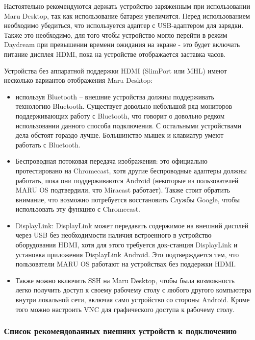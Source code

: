 \documentclass[a4paper, 14pt]{article}
\begin{document}
\par Настоятельно рекомендуются держать устройство заряженным при использовании Maru Desktop, так как использование батареи увеличится. Перед использованием необходимо убедиться, что используется адаптер с USB-адаптером для зарядки. Также это необходимо, для того чтобы устройство могло перейти в режим Daydream при превышении времени ожидания на экране - это будет включать питание дисплея HDMI, пока на устройстве отображается заставка часов.

\par Устройства без аппаратной поддержки HDMI (SlimPort или MHL) имеют несколько вариантов отображения Maru Desktop:
\begin{itemize}
    \item используя Bluetooth -- внешние устройства должны поддерживать технологию Bluetooth. Существует довольно небольшой ряд мониторов поддерживающих работу с Bluetooth, что говорит о довольно редком использовании данного способа подключения. С остальными устройствами дела обстоят гораздо лучше. Большинство мышек и клавиатур умеют работать с Bluetooth.
    \item Беспроводная потоковая передача изображения: это официально протестировано на Chromecast, хотя другие беспроводные адаптеры должны работать, пока они поддерживаются Android (некоторые из пользователей MARU OS подтвердили, что Miracast работает). Также стоит обратить внимание, что возможно потребуется восстановить Службы Google, чтобы использовать эту функцию с Chromecast.
    \item DisplayLink: DisplayLink может передавать содержимое на внешний дисплей через USB без необходимости наличия встроенного в устройство оборудования HDMI, хотя для этого требуется док-станция DisplayLink и установка приложения DisplayLink Android. Это подтверждается тем, что пользователи MARU OS работают на устройствах без поддержки HDMI.
    \item Также можно включить SSH на Maru Desktop, чтобы была возможность легко получить доступ к своему рабочему столу с любого другого компьютера внутри локальной сети, включая само устройство со стороны Android. Кроме того можно настроить VNC для графического доступа к рабочему столу.
\end{itemize}


\subsubsection{Список рекомендованных внешних устройств к подключению}
\end{document}
